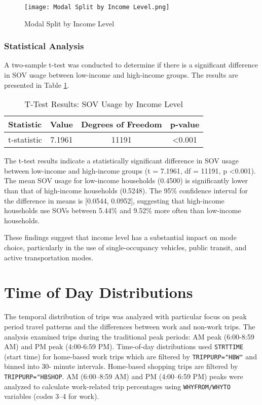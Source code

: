 \begin{figure}[h]
    \centering
    \texttt{[image: Modal Split by Income Level.png]}
    \caption{Modal Split by Income Level}
    \label{fig:Modal Split by Income Level}
\end{figure}




\subsubsection{Statistical Analysis}

A two-sample t-test was conducted to determine if there is a significant difference in SOV usage between low-income and high-income groups. The results are presented in Table \ref{tab:ttest_income}.

\begin{table}[h!]
\centering
\caption{T-Test Results: SOV Usage by Income Level}
\label{tab:ttest_income}
\begin{tabular}{@{}lccc@{}}
\toprule
Statistic & Value & Degrees of Freedom & p-value \\ \midrule
t-statistic & 7.1961 & 11191 & \textless 0.001 \\
\bottomrule
\end{tabular}
\end{table}


The t-test results indicate a statistically significant difference in SOV usage between low-income and high-income groups (t = 7.1961, df = 11191, p \textless 0.001). The mean SOV usage for low-income households (0.4500) is significantly lower than that of high-income households (0.5248). The 95\% confidence interval for the difference in means is [0.0544, 0.0952], suggesting that high-income households use SOVs between 5.44\% and 9.52\% more often than low-income households.

These findings suggest that income level has a substantial impact on mode choice, particularly in the use of single-occupancy vehicles, public transit, and active transportation modes.

\section{Time of Day Distributions}
The temporal distribution of trips was analyzed with particular focus on peak period travel patterns and the differences between work and non-work trips. The analysis examined trips during the traditional peak periods: AM peak (6:00-8:59 AM) and PM peak (4:00-6:59 PM). Time-of-day distributions used \texttt{STRTTIME} (start time) for home-based work trips which are filtered by \texttt{TRIPPURP="HBW"} and binned into 30- minute intervals. Home-based shopping trips are filtered by \texttt{TRIPPURP="HBSHOP}. AM (6:00–8:59 AM) and PM (4:00–6:59 PM) peaks were analyzed to calculate work-related trip percentages using \texttt{WHYFROM/WHYTO} variables (codes 3–4 for work).

